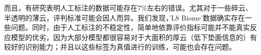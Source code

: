 \documentclass[UTF8]{ctexart}
\begin{document}

而且，有研究表明\cite{scaramuzza2011development}人工标注的数据可能存在7\%左右的错误。尤其对于一些碎云、半透明的薄云，评判标准可能会因人而异。我们发现，'L8 Biome'数据确实存在一些问题。同时，由于人工标注的不稳定性，简单地依靠评价指标可能并不能真实反应模型的优劣，因为大部分模型都很容易对于大面积的厚云（低下垫面信息的）有较好的识别能力；并且以这些标签为真值进行的训练，可能也会存在问题。
\end{document}
